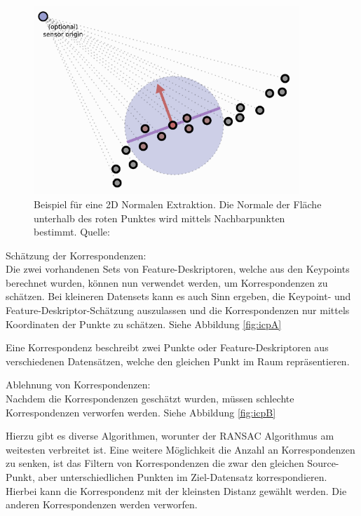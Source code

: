 \begin{figure}[H]
    \centering
    \includegraphics[width=10cm]{graphics/normals.png}
    \caption{Beispiel für eine 2D Normalen Extraktion. 
             Die Normale der Fläche unterhalb des roten Punktes wird mittels Nachbarpunkten bestimmt.
             Quelle: \cite{normals2024}}
    \label{fig:normals}
\end{figure}

Schätzung der Korrespondenzen: \\
Die zwei vorhandenen Sets von Feature-Deskriptoren, welche aus den Keypoints berechnet wurden, 
können nun verwendet werden, um Korrespondenzen zu schätzen.
Bei kleineren Datensets kann es auch Sinn ergeben, die Keypoint- und Feature-Deskriptor-Schätzung auszulassen
und die Korrespondenzen nur mittels Koordinaten der Punkte zu schätzen. Siehe Abbildung \ref{fig:icpA}

Eine Korrespondenz beschreibt zwei Punkte oder Feature-Deskriptoren aus verschiedenen Datensätzen, welche den gleichen Punkt im Raum repräsentieren.
\newline

Ablehnung von Korrespondenzen: \\
Nachdem die Korrespondenzen geschätzt wurden, müssen schlechte Korrespondenzen verworfen werden.
Siehe Abbildung \ref{fig:icpB}

Hierzu gibt es diverse Algorithmen, worunter der RANSAC Algorithmus am weitesten verbreitet ist.
Eine weitere Möglichkeit die Anzahl an Korrespondenzen zu senken, 
ist das Filtern von Korrespondenzen die zwar den gleichen Source-Punkt,
aber unterschiedlichen Punkten im Ziel-Datensatz korrespondieren.
Hierbei kann die Korrespondenz mit der kleinsten Distanz gewählt werden.
Die anderen Korrespondenzen werden verworfen.
\newline

